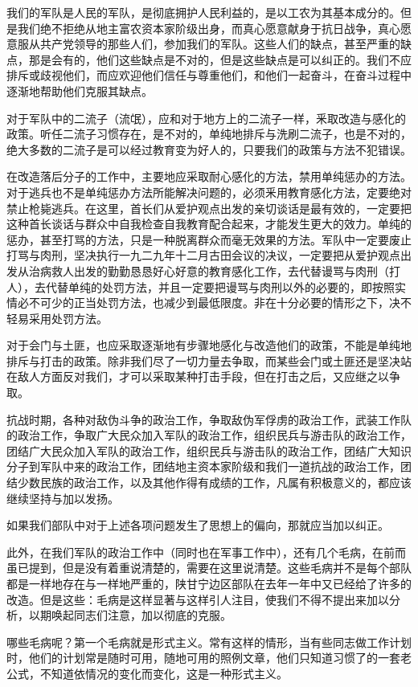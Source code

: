我们的军队是人民的军队，是彻底拥护人民利益的，是以工农为其基本成分的。但是我们绝不拒绝从地主富农资本家阶级出身，而真心愿意献身于抗日战争，真心愿意服从共产党领导的那些人们，参加我们的军队。这些人们的缺点，甚至严重的缺点，那是会有的，他们这些缺点是不对的，但是这些缺点是可以纠正的。我们不应排斥或歧视他们，而应欢迎他们信任与尊重他们，和他们一起奋斗，在奋斗过程中逐渐地帮助他们克服其缺点。

对于军队中的二流子（流氓），应和对于地方上的二流子一样，釆取改造与感化的政策。听任二流子习惯存在，是不对的，单纯地排斥与洗刷二流子，也是不对的，绝大多数的二流子是可以经过教育变为好人的，只要我们的政策与方法不犯错误。

在改造落后分子的工作中，主要地应采取耐心感化的方法，禁用单纯惩办的方法。对于逃兵也不是单纯惩办方法所能解决问题的，必须釆用教育感化方法，定要绝对禁止枪毙逃兵。在这里，首长们从爱护观点出发的亲切谈话是最有效的，一定要把这种首长谈话与群众中自我检查自我教育配合起来，才能发生更大的效力。单纯的惩办，甚至打骂的方法，只是一种脱离群众而毫无效果的方法。军队中一定要废止打骂与肉刑，坚决执行一九二九年十二月古田会议的决议，一定要把从爱护观点出发从治病救人出发的勤勤恳恳好心好意的教育感化工作，去代替谩骂与肉刑（打人），去代替单纯的处罚方法，并且一定要把谩骂与肉刑以外的必要的，即按照实情必不可少的正当处罚方法，也减少到最低限度。非在十分必要的情形之下，决不轻易采用处罚方法。

对于会门与土匪，也应采取逐渐地有步骤地感化与改造他们的政策，不能是单纯地排斥与打击的政策。除非我们尽了一切力量去争取，而某些会门或土匪还是坚决站在敌人方面反对我们，才可以采取某种打击手段，但在打击之后，又应继之以争取。

抗战时期，各种对敌伪斗争的政治工作，争取敌伪军俘虏的政治工作，武装工作队的政治工作，争取广大民众加入军队的政治工作，组织民兵与游击队的政治工作，团结广大民众加入军队的政治工作，组织民兵与游击队的政治工作，团结广大知识分子到军队中来的政治工作，团结地主资本家阶级和我们一道抗战的政治工作，团结少数民族的政治工作，以及其他作得有成绩的工作，凡属有积极意义的，都应该继续坚持与加以发扬。

如果我们部队中对于上述各项问题发生了思想上的偏向，那就应当加以纠正。

此外，在我们军队的政治工作中（同时也在军事工作中），还有几个毛病，在前而虽已提到，但是没有着重说清楚的，需要在这里说清楚。这些毛病并不是每个部队都是一样地存在与一样地严重的，陕甘宁边区部队在去年一年中又已经给了许多的改造。但是这些：毛病是这样显著与这样引人注目，使我们不得不提出来加以分析，以期唤起同志们注意，加以彻底的克服。

哪些毛病呢？第一个毛病就是形式主义。常有这样的情形，当有些同志做工作计划时，他们的计划常是随时可用，随地可用的照例文章，他们只知道习惯了的一套老公式，不知道依情况的变化而变化，这是一种形式主义。

